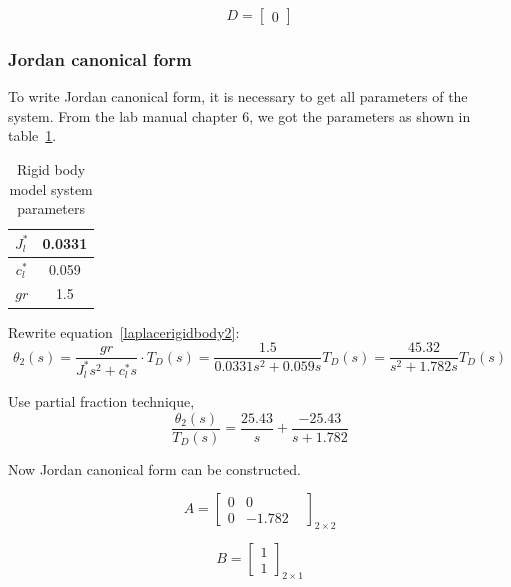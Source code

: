 \documentclass[a4paper, 12pt]{article}
\begin{document}
\begin{equation}
D = \begin{bmatrix} 0 \end{bmatrix}
\end{equation}

\subsubsection{Jordan canonical form}\label{RigidJordan}
\hspace{2.5ex} To write Jordan canonical form, it is necessary to get all parameters of the system. 
From the lab manual chapter 6, we got the parameters as shown in table~\ref{rigidsystemparameters}.

\begin{table}[!htbp]
\centering
\caption{Rigid body model system parameters}
\label{rigidsystemparameters}
\begin{tabular}{|c|c|}
\hline
$J_l^*$	&	0.0331	\\	\hline
$c_l^*$	&	0.059\\	\hline
$gr$	&	1.5	\\ \hline
\end{tabular}
\end{table}

Rewrite equation~\ref{laplacerigidbody2}:
\begin{equation}\label{rigidJordanTF}
\theta_2(s) =\dfrac{gr}{J_l^* s^2 + c_l^* s} \cdot T_D(s) = \dfrac{1.5}{0.0331s^2+0.059s} T_D(s) = \dfrac{45.32}{s^2+1.782s} T_D(s)
\end{equation}

Use partial fraction technique, 
\begin{equation}\label{rigidJordanPartial}
\dfrac{\theta_2(s)}{T_D(s)} = \dfrac{25.43}{s} + \dfrac{-25.43}{s+1.782}
\end{equation}

Now Jordan canonical form can be constructed. 

\begin{equation}\label{rigidJordanA}
A = \begin{bmatrix}
0	&	0	&	\\
0	&	-1.782	
\end{bmatrix}_{2\times 2}
\end{equation}

\begin{equation}\label{rigidJordanB}
B = \begin{bmatrix}
1	\\
1
\end{bmatrix}_{2\times 1}
\end{equation}
\end{document}
